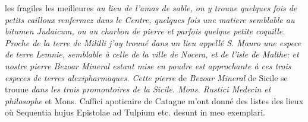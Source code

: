 %
les fragiles les meilleures
\textit{au lieu de l'amas de sable, on y trouue quelques fois de petits cailloux renfermez dans le Centre, quelques fois une matiere semblable au bitumen Judaicum\protect{}, ou au charbon de pierre et parfois quelque petite coquille.}
%
\textit{Proche de la terre de Mililli\protect{} j'ay trouu\'{e} dans un lieu appell\'{e} S. Mauro\protect{} une espece de terre Lemnie\protect{}, semblable \`{a} celle de la ville de Nocera\protect{}, et de l'isle de Malthe\protect{}: et nostre pierre Bezoar Mineral\protect{} estant mise en poudre est approchante \`{a} ces trois especes de terres alexipharmaques\protect{}. Cette pierre} de \textit{Bezoar Mineral\protect{}} de Sicile\protect{} se trouue \textit{dans les trois promontoires de la Sicile\protect{}. Mons. Rustici Medecin et philosophe}
%
et Mons. Caffici apoticaire de Catagne\protect{} m'ont donn\'{e} des listes des lieux o\`{u} 
Sequentia hujus Epistolae ad Tulpium\protect{} etc. desunt in meo exemplari.
\pend
\count{}
\count{}
\count{}